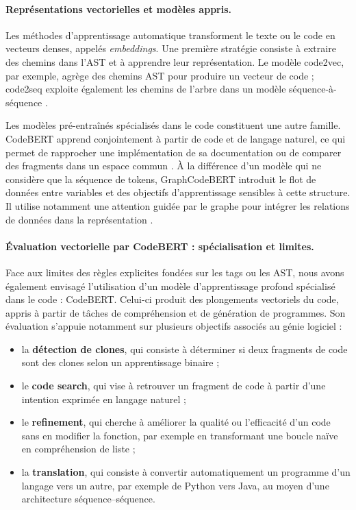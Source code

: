 \documentclass[12pt,a4paper,oneside]{report}
\begin{document}
\paragraph{Représentations vectorielles et modèles appris.}

Les méthodes d'apprentissage automatique transforment le texte ou le code en
vecteurs denses, appelés \emph{embeddings}. Une première stratégie consiste
à extraire des chemins dans l'AST et à apprendre leur représentation. Le
modèle code2vec, par exemple, agrège des chemins AST pour produire un vecteur
de code \cite{alon_2019} ; code2seq exploite également les chemins de l'arbre
dans un modèle séquence-à-séquence \cite{alon_code2seq_2019}.

Les modèles pré-entraînés spécialisés dans le code constituent une autre
famille. CodeBERT apprend conjointement à partir de code et de langage
naturel, ce qui permet de rapprocher une implémentation de sa documentation
ou de comparer des fragments dans un espace commun \cite{feng_2020}. À la
différence d'un modèle qui ne considère que la séquence de tokens,
GraphCodeBERT introduit le flot de données entre variables et des objectifs
d'apprentissage sensibles à cette structure. Il utilise notamment une
attention guidée par le graphe pour intégrer les relations de données dans
la représentation \cite{guo_2021}.

\paragraph{Évaluation vectorielle par CodeBERT : spécialisation et limites.}

Face aux limites des règles explicites fondées sur les tags ou les AST, nous
avons également envisagé l'utilisation d'un modèle d'apprentissage profond
spécialisé dans le code : CodeBERT. Celui-ci produit des plongements
vectoriels du code, appris à partir de tâches de compréhension et de
génération de programmes. Son évaluation s'appuie notamment sur plusieurs
objectifs associés au génie logiciel :

\begin{itemize}
    \item la \textbf{détection de clones}, qui consiste à déterminer si deux
    fragments de code sont des clones selon un apprentissage binaire ;
    \item le \textbf{code search}, qui vise à retrouver un fragment de code
    à partir d'une intention exprimée en langage naturel ;
    \item le \textbf{refinement}, qui cherche à améliorer la qualité ou
    l'efficacité d'un code sans en modifier la fonction, par exemple en
    transformant une boucle naïve en compréhension de liste ;
    \item la \textbf{translation}, qui consiste à convertir
    automatiquement un programme d'un langage vers un autre, par exemple de
    Python vers Java, au moyen d'une architecture séquence--séquence.
\end{itemize}
\end{document}
